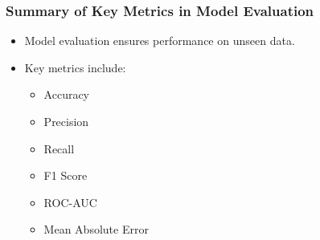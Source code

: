 \documentclass{beamer}
\begin{document}
\begin{frame}[fragile]
    \frametitle{Summary of Key Metrics in Model Evaluation}
    \begin{itemize}
        \item Model evaluation ensures performance on unseen data.
        \item Key metrics include:
            \begin{itemize}
                \item Accuracy
                \item Precision
                \item Recall
                \item F1 Score
                \item ROC-AUC
                \item Mean Absolute Error
            \end{itemize}
    \end{itemize}
\end{frame}
\end{document}
